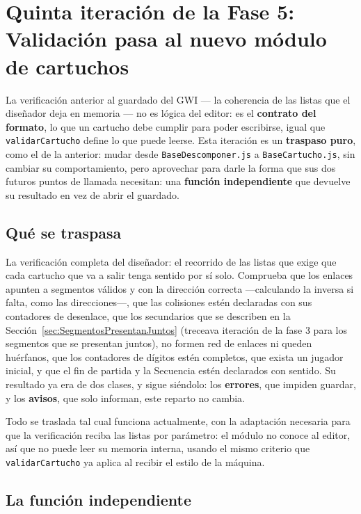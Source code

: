 \section{Quinta iteración de la Fase 5: Validación pasa al nuevo módulo de cartuchos}
\label{sec:F5I5}

La verificación anterior al guardado del GWI — la coherencia
de las listas que el diseñador deja en memoria — no es lógica del
editor: es el \textbf{contrato del formato}, lo que un cartucho
debe cumplir para poder escribirse, igual que \texttt{validarCartucho}
define lo que puede leerse. Esta iteración es un
\textbf{traspaso puro}, como el de la anterior: mudar desde 
\texttt{BaseDescomponer.js} a \texttt{BaseCartucho.js}, sin cambiar
su comportamiento, pero aprovechar para darle la forma que sus dos
futuros puntos de llamada necesitan: una \textbf{función independiente}
que devuelve su resultado en vez de abrir el guardado.

\subsection{Qué se traspasa}
\label{sec:F5I5Que}

La verificación completa del diseñador: el recorrido de las
listas que exige que cada cartucho que va a salir tenga sentido
por sí solo. Comprueba que los enlaces apunten a segmentos
válidos y con la dirección correcta —calculando la inversa si
falta, como las direcciones—, que las colisiones estén declaradas
con sus contadores de desenlace, que los secundarios que se describen en la 
Sección~\ref{sec:SegmentosPresentanJuntos} (treceava iteración de la fase 3 para los
segmentos que se presentan juntos), no formen red de enlaces ni queden huérfanos,
que los contadores de dígitos estén completos, que exista un
jugador inicial, y que el fin de partida y la Secuencia estén
declarados con sentido. Su resultado ya era de dos clases, y
sigue siéndolo: los \textbf{errores}, que impiden guardar, y los
\textbf{avisos}, que solo informan, este reparto no cambia.

Todo se traslada tal cual funciona actualmente, con la adaptación necesaria para
que la verificación reciba las listas por parámetro: el módulo
no conoce al editor, así que no puede leer su memoria interna, usando 
el mismo criterio que \texttt{validarCartucho} ya aplica al
recibir el estilo de la máquina.

\subsection{La función independiente}
\label{sec:F5I5Funcion}

